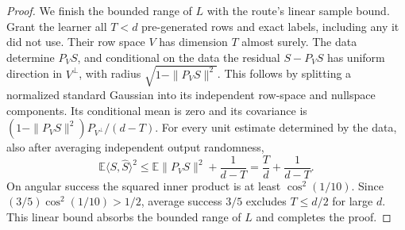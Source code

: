 \begin{proof}
We finish the bounded range of $L$ with the route's linear sample bound.
Grant the learner all $T<d$ pre-generated rows and exact labels, including
any it did not use.  Their row space $V$ has dimension $T$ almost surely.
The data determine $P_VS$, and conditional on the data the residual
$S-P_VS$ has uniform direction in $V^\perp$, with radius
$\sqrt{1-\|P_VS\|^2}$.  This follows by splitting a normalized standard
Gaussian into its independent row-space and nullspace components.
Its conditional mean is zero and its covariance is
$(1-\|P_VS\|^2)P_{V^\perp}/(d-T)$.  For every unit estimate determined
by the data, also after averaging independent output randomness,
\begin{equation}\label{l:grid:linear-endpoint}
 \mathbb E\langle S,\widehat S\rangle^2
 \le\mathbb E\|P_VS\|^2+\frac1{d-T}
 =\frac Td+\frac1{d-T}.
\end{equation}
On angular success the squared inner product is at least
$\cos^2(1/10)$.  Since $(3/5)\cos^2(1/10)>1/2$, average success
$3/5$ excludes $T\le d/2$ for large $d$.  This linear bound absorbs
the bounded range of $L$ and completes the proof.
\end{proof}
